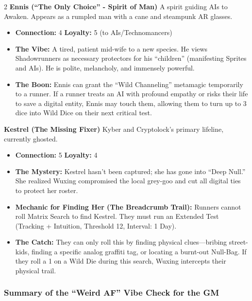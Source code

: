 \documentclass[
  oneside]{article}
\providecommand{\tightlist}{%
  \setlength{\itemsep}{0pt}\setlength{\parskip}{0pt}}
\begin{document}
\begin{multicols}{2}
\textbf{Ennis (``The Only Choice'' - Spirit of
Man)} A spirit guiding AIs to Awaken. Appears as a
rumpled man with a cane and steampunk AR glasses.

\begin{itemize}
\tightlist
\item
  \textbf{Connection:} 4 \textbar{}
  \textbf{Loyalty:} 5 (to AIs/Technomancers)
\item
  \textbf{The Vibe:} A tired, patient mid-wife to
  a new species. He views Shadowrunners as
  necessary protectors for his ``children''
  (manifesting Sprites and AIs). He is polite,
  melancholy, and immensely powerful.
\item
  \textbf{The Boon:} Ennis can grant the ``Wild
  Channeling'' metamagic temporarily to a runner.
  If a runner treats an AI with profound empathy
  or risks their life to save a digital entity,
  Ennis may touch them, allowing them to turn up
  to 3 dice into Wild Dice on their next critical
  test.
\end{itemize}

\textbf{Kestrel (The Missing Fixer)} Kyber and
Cryptolock's primary lifeline, currently ghosted.

\begin{itemize}
\tightlist
\item
  \textbf{Connection:} 5 \textbar{}
  \textbf{Loyalty:} 4
\item
  \textbf{The Mystery:} Kestrel hasn't been
  captured; she has gone into ``Deep Null.'' She
  realized Wuxing compromised the local grey-goo
  and cut all digital ties to protect her roster.
\item
  \textbf{Mechanic for Finding Her (The Breadcrumb
  Trail):} Runners cannot roll Matrix Search to
  find Kestrel. They must run an Extended Test
  (Tracking + Intuition, Threshold 12, Interval: 1
  Day).
\item
  \textbf{The Catch:} They can only roll this by
  finding physical clues---bribing street-kids,
  finding a specific analog graffiti tag, or
  locating a burnt-out Null-Bag. If they roll a 1
  on a Wild Die during this search, Wuxing
  intercepts their physical trail.
\end{itemize}

\hypertarget{summary-of-the-weird-af-vibe-check-for-the-gm}{%
\subsubsection{Summary of the ``Weird AF'' Vibe
Check for the
GM}\label{summary-of-the-weird-af-vibe-check-for-the-gm}}


\end{multicols}
\end{document}
